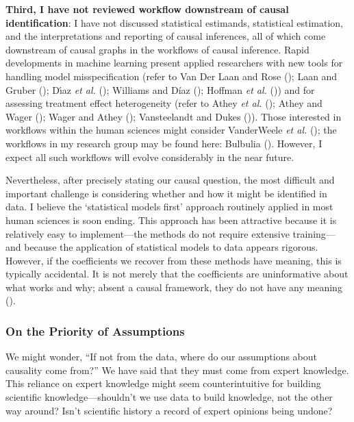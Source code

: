 \documentclass[
  single column]{article}
\begin{document}
\textbf{Third, I have not reviewed workflow downstream of causal
identification}: I have not discussed statistical estimands, statistical
estimation, and the interpretations and reporting of causal inferences,
all of which come downstream of causal graphs in the workflows of causal
inference. Rapid developments in machine learning present applied
researchers with new tools for handling model misspecification (refer to
Van Der Laan and Rose (); Laan and
Gruber (); Dı́az \emph{et al.}
(); Williams and Díaz
(); Hoffman \emph{et al.}
()) and for assessing treatment effect
heterogeneity (refer to Athey \emph{et al.}
(); Athey and Wager
(); Wager and Athey
(); Vansteelandt and Dukes
()). Those interested in workflows
within the human sciences might consider VanderWeele \emph{et al.}
(); the workflows in my research
group may be found here: Bulbulia
(). However, I expect all such
workflows will evolve considerably in the near future.

Nevertheless, after precisely stating our causal question, the most
difficult and important challenge is considering whether and how it
might be identified in data. I believe the `statistical models first'
approach routinely applied in most human sciences is soon ending. This
approach has been attractive because it is relatively easy to
implement---the methods do not require extensive training---and because
the application of statistical models to data appears rigorous. However,
if the coefficients we recover from these methods have meaning, this is
typically accidental. It is not merely that the coefficients are
uninformative about what works and why; absent a causal framework, they
do not have any meaning ().

\subsubsection{On the Priority of
Assumptions}\label{on-the-priority-of-assumptions}

We might wonder, ``If not from the data, where do our assumptions about
causality come from?'' We have said that they must come from expert
knowledge. This reliance on expert knowledge might seem counterintuitive
for building scientific knowledge---shouldn't we use data to build
knowledge, not the other way around? Isn't scientific history a record
of expert opinions being undone?
\end{document}
